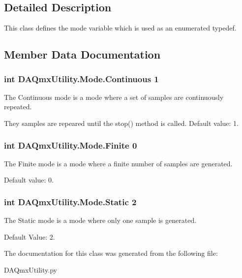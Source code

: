 \subsection{Detailed Description}
This class defines the mode variable which is used as an enumerated typedef. 



\subsection{Member Data Documentation}
\hypertarget{class_d_a_qmx_utility_1_1_mode_a9e5a660549cbb0b432aec68a78e95ecd}{
\subsubsection[{Continuous}]{\setlength{\rightskip}{0pt plus 5cm}int D\-A\-Qmx\-Utility.\-Mode.\-Continuous 1\hspace{0.3cm}{\ttfamily [static]}}}\label{class_d_a_qmx_utility_1_1_mode_a9e5a660549cbb0b432aec68a78e95ecd}


The Continuous mode is a mode where a set of samples are continuously repeated. 

They samples are repeared until the stop() method is called. Default value\-: 1. \hypertarget{class_d_a_qmx_utility_1_1_mode_aedf31db1abedc987384fa876f205b6e3}{
\subsubsection[{Finite}]{\setlength{\rightskip}{0pt plus 5cm}int D\-A\-Qmx\-Utility.\-Mode.\-Finite 0\hspace{0.3cm}{\ttfamily [static]}}}\label{class_d_a_qmx_utility_1_1_mode_aedf31db1abedc987384fa876f205b6e3}


The Finite mode is a mode where a finite number of samples are generated. 

Default value\-: 0. \hypertarget{class_d_a_qmx_utility_1_1_mode_aeb3dddf49d2987e35fe408bc53b2e0ec}{
\subsubsection[{Static}]{\setlength{\rightskip}{0pt plus 5cm}int D\-A\-Qmx\-Utility.\-Mode.\-Static 2\hspace{0.3cm}{\ttfamily [static]}}}\label{class_d_a_qmx_utility_1_1_mode_aeb3dddf49d2987e35fe408bc53b2e0ec}


The Static mode is a mode where only one sample is generated. 

Default Value\-: 2. 

The documentation for this class was generated from the following file\-:\begin{DoxyCompactItemize}
\item 
D\-A\-Qmx\-Utility.\-py\end{DoxyCompactItemize}
